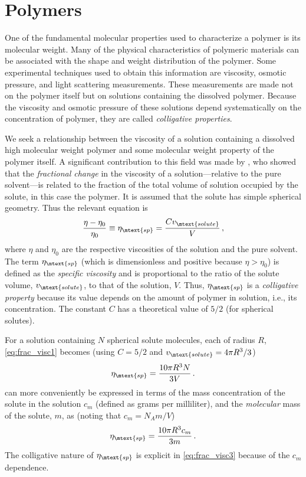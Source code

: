 
\section{Polymers} %
\label{sec:polymers}

One of the fundamental molecular properties used to characterize a polymer is its molecular weight. Many of the physical characteristics of polymeric materials can be associated with the shape and weight distribution of the polymer. Some experimental techniques used to obtain this information are viscosity, osmotic pressure, and light scattering measurements. These measurements are made not on the polymer itself but on solutions containing the dissolved polymer. Because the viscosity and osmotic pressure of these solutions depend systematically on the concentration of polymer, they are called \emph{colligative properties}. 

We seek a relationship between the viscosity of a solution containing a dissolved high molecular weight polymer and some molecular weight property of the polymer itself. 
A significant contribution to this field was made by \textcite{einstein06}, who showed that the \emph{fractional change} in the viscosity of a solution---relative to the pure solvent---is related to the fraction of the total volume of solution occupied by the solute, in this case the polymer. 
It is assumed that the solute has simple spherical geometry. 
Thus the relevant equation is
\begin{equation}
	\frac{\eta - \eta_0}{\eta_0} \equiv \eta_\mtext{sp} = \frac{C v_\mtext{solute}}{V} \, ,
	\label{eq:frac_visc1}
\end{equation}
where \( \eta \) and \( \eta_0 \) are the respective viscosities of the solution and the pure solvent. 
The term \( \eta_\mtext{sp} \) (which is dimensionless and positive because \( \eta > \eta_0 \)) is defined as the \emph{specific viscosity} and is proportional to the ratio of the solute volume, \( v_\mtext{solute} \), to that of the solution, \( V \). 
Thus, \( \eta_\mtext{sp} \) is a \emph{colligative property} because its value depends on the amount of polymer in solution, i.e., its concentration. 
The constant \( C \) has a theoretical value of \( 5/2 \) (for spherical solutes). 

For a solution containing \( N \) spherical solute molecules, each of radius \( R \), \cref{eq:frac_visc1} becomes (using \( C = 5/2 \) and \( v_\mtext{solute} = 4 \pi R^3 / 3 \))
\begin{equation}
	\eta_\mtext{sp} = \frac{10 \pi R^3 N}{3 V} \, .
	\label{eq:frac_visc2}
\end{equation}
 can more conveniently be expressed in terms of the mass concentration of the solute in the solution \( c_m \) (defined as grams per milliliter), and the \emph{molecular} mass of the solute, \( m \), as (noting that \( c_m = N_A m / V \))
\begin{equation}
	\eta_\mtext{sp} = \frac{10 \pi R^3 c_m}{3 m} \, .
	\label{eq:frac_visc3}
\end{equation}
The colligative nature of \( \eta_\mtext{sp} \) is explicit in \cref{eq:frac_visc3} because of the \( c_m \) dependence. 

